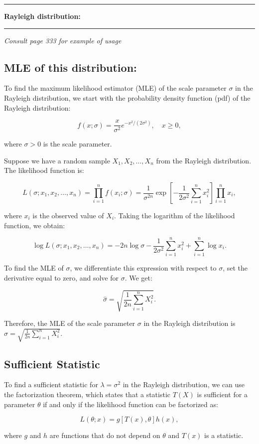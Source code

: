 \documentclass[11pt]{article}
\newcommand\question[2]{\vspace{.25in}\hrule\textbf{#1: #2}\vspace{.5em}\hrule\vspace{.10in}}
\begin{document}
\question{Rayleigh distribution}{}

\textit{Consult page 333 for example of usage}
\subsection*{MLE of this distribution:}
To find the maximum likelihood estimator (MLE) of the scale parameter $\sigma$ in the Rayleigh distribution, we start with the probability density function (pdf) of the Rayleigh distribution:

$$f(x;\sigma) = \frac{x}{\sigma^2} e^{-x^2/(2\sigma^2)}, \quad x \geq 0,$$

where $\sigma > 0$ is the scale parameter.

Suppose we have a random sample $X_1, X_2, \ldots, X_n$ from the Rayleigh distribution. The likelihood function is:

$$L(\sigma; x_1, x_2, \ldots, x_n) = \prod_{i=1}^n f(x_i; \sigma) = \frac{1}{\sigma^{2n}} \exp\left[-\frac{1}{2\sigma^2} \sum_{i=1}^n x_i^2\right] \prod_{i=1}^n x_i,$$

where $x_i$ is the observed value of $X_i$. Taking the logarithm of the likelihood function, we obtain:

$$\log L(\sigma; x_1, x_2, \ldots, x_n) = -2n\log\sigma - \frac{1}{2\sigma^2}\sum_{i=1}^n x_i^2 + \sum_{i=1}^n \log x_i.$$

To find the MLE of $\sigma$, we differentiate this expression with respect to $\sigma$, set the derivative equal to zero, and solve for $\sigma$. We get:

$$\hat{\sigma} = \sqrt{\frac{1}{2n}\sum_{i=1}^n X_i^2}.$$

Therefore, the MLE of the scale parameter $\sigma$ in the Rayleigh distribution is $\hat{\sigma} = \sqrt{\frac{1}{2n}\sum_{i=1}^n X_i^2}$.

\subsection*{Sufficient Statistic}
To find a sufficient statistic for $\lambda = \sigma^2$ in the Rayleigh distribution, we can use the factorization theorem, which states that a statistic $T(X)$ is sufficient for a parameter $\theta$ if and only if the likelihood function can be factorized as:

$$L(\theta; x) = g[T(x),\theta]h(x),$$

where $g$ and $h$ are functions that do not depend on $\theta$ and $T(x)$ is a statistic.
\end{document}
